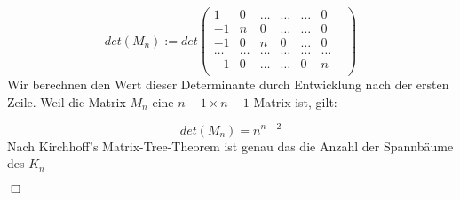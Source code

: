 \begin{equation}
det(M_n):=det
\begin{pmatrix}
1&0&\ldots&\ldots&\ldots&0\\
-1&n&0&\ldots&\ldots&0\\
-1&0&n&0&\ldots&0\\
\ldots&\ldots&\ldots&\ldots&\ldots&\ldots&\\
-1&0&\ldots&\ldots&0&n\\
\end{pmatrix}
\end{equation}
Wir berechnen den Wert dieser Determinante durch Entwicklung nach der ersten Zeile. Weil die Matrix $M_n$ eine $n-1 \times n-1$ Matrix ist, gilt:

\begin{equation}
 det(M_n)=n^{n-2}
\end{equation}
Nach Kirchhoff's Matrix-Tree-Theorem ist genau das die Anzahl der Spannbäume des $K_n$
\begin{flushright} $\Box$ \end{flushright} 
